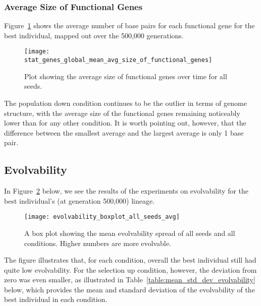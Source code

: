 \subsubsection{Average Size of Functional Genes}\label{sec:average_size_functional_genes}
Figure~\ref{fig:mean_functional_gene_size} shows the average number of base pairs for each functional gene for the best individual, mapped out over the 500,000 generations. 
\begin{figure}[H]
	\centering
	\texttt{[image: stat\_genes\_global\_mean\_avg\_size\_of\_functional\_genes]}
	\caption[Average size of functional genes]{Plot showing the average size of functional genes over time for all seeds.}
	\label{fig:mean_functional_gene_size}
\end{figure}
The population down condition continues to be the outlier in terms of genome structure, with the average size of the functional genes remaining noticeably lower than for any other condition. It is worth pointing out, however, that the difference between the smallest average and the largest average is only 1 base pair. 

\subsection{Evolvability}
In Figure~\ref{fig:evolvability_mean} below, we see the results of the experiments on evolvability for the best individual's (at generation 500,000) lineage. 
\begin{figure}[H]
	\centering
	\texttt{[image: evolvability\_boxplot\_all\_seeds\_avg]}
	\caption[Evolvability boxplot]{A box plot showing the mean evolvability spread of all seeds and all conditions. Higher numbers are more evolvable.}
	\label{fig:evolvability_mean}	
\end{figure}
The figure illustrates that, for each condition, overall the best individual still had quite low evolvability. For the selection up condition, however, the deviation from zero was even smaller, as illustrated in Table~\ref{table:mean_std_dev_evolvability} below, which provides the mean and standard deviation of the evolvability of the best individual in each condition. 

